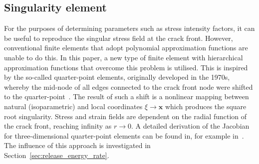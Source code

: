 \documentclass[onecolumn]{svjour3}
\begin{document}
\subsection{Singularity element}
\label{sec:singularity}
For the purposes of determining parameters such as stress intensity factors, it can be useful to reproduce the singular stress field at the crack front. However, conventional finite elements that adopt polynomial approximation functions are unable to do this. 
In this paper, a new type of finite element with hierarchical approximation functions that overcome this problem is utilised. This is inspired by the so-called quarter-point elements, originally developed in the 1970s, whereby the mid-node of all edges connected to the crack front node were shifted to the quarter-point~\cite{barsoum1976use,henshell1975crack}. 
% 
The result of such a shift is a nonlinear mapping between natural (isoparametric) and local coordinates $\xi \rightarrow \mathbf x$ which produces the square root singularity. Stress and strain fields are dependent on the radial function of the crack front, reaching infinity as $ r \rightarrow 0$. 
% 
A detailed derivation of the Jacobian for three-dimensional quarter-point elements can be found in, for example in~\citep{nejati2015use}. 
The influence of this approach is investigated in Section~\ref{sec:release_energy_rate}.

\end{document}
